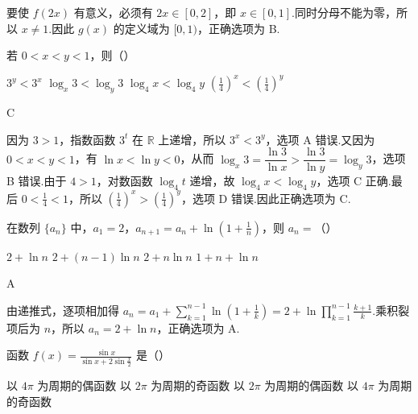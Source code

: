 \begin{solution}
要使 \(f(2x)\) 有意义，必须有 \(2x\in[0,2]\)，即 \(x\in[0,1]\).同时分母不能为零，所以 \(x\ne1\).因此 \(g(x)\) 的定义域为 \([0,1)\)，正确选项为 B.
\end{solution}

\begin{problem}
若 \(0 < x < y < 1\)，则（\quad）

\choices
    {\(3^{y} < 3^{x}\)}
    {\(\log_{x}3 < \log_{y}3\)}
    {\(\log_4x < \log_4y\)}
    {\(\left(\frac{1}{4}\right)^x < \left(\frac{1}{4}\right)^y\)}
\end{problem}

\begin{answer}
C
\end{answer}

\begin{solution}
因为 \(3>1\)，指数函数 \(3^t\) 在 \(\mathbb R\) 上递增，所以 \(3^x<3^y\)，选项 A 错误.又因为 \(0<x<y<1\)，有 \(\ln x<\ln y<0\)，从而 \(\log_x3=\dfrac{\ln3}{\ln x}>\dfrac{\ln3}{\ln y}=\log_y3\)，选项 B 错误.由于 \(4>1\)，对数函数 \(\log_4t\) 递增，故 \(\log_4x<\log_4y\)，选项 C 正确.最后 \(0<\frac14<1\)，所以 \(\left(\frac14\right)^x>\left(\frac14\right)^y\)，选项 D 错误.因此正确选项为 C.
\end{solution}

\begin{problem}
在数列 \(\{a_{n}\}\) 中，\(a_{1} = 2\)，\(a_{n+1} = a_{n} + \ln \left(1 + \frac{1}{n}\right)\)，则 \(a_{n} =\)（\quad）

\choices
    {\(2 + \ln n\)}
    {\(2 + (n - 1)\ln n\)}
    {\(2 + n\ln n\)}
    {\(1 + n + \ln n\)}
\end{problem}

\begin{answer}
A
\end{answer}

\begin{solution}
由递推式，逐项相加得 \(a_n=a_1+\displaystyle\sum_{k=1}^{n-1}\ln\left(1+\frac1k\right)=2+\ln\displaystyle\prod_{k=1}^{n-1}\frac{k+1}{k}\).乘积裂项后为 \(n\)，所以 \(a_n=2+\ln n\)，正确选项为 A.
\end{solution}

\begin{problem}
函数 \( f(x) = \frac{\sin x}{\sin x + 2\sin \frac{x}{2}} \) 是（\quad）

\choices
    {以 \(4\pi\) 为周期的偶函数}
    {以 \(2\pi\) 为周期的奇函数}
    {以 \(2\pi\) 为周期的偶函数}
    {以 \(4\pi\) 为周期的奇函数}
\end{problem}

